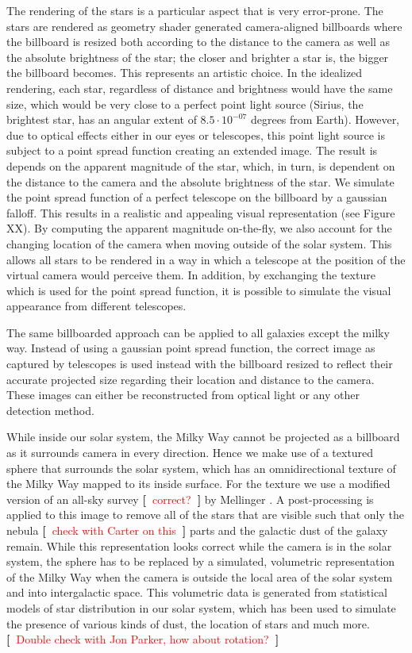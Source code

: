 \documentclass{vgtc}                %
\newcommand{\todo}[1]{\textbf{[~}\textcolor {red}{#1}\marginpar{\textcolor {red}{\centerline{{\Huge \textbf{!}}}}}\textbf{~]}}
\begin{document}
The rendering of the stars is a particular aspect that is very error-prone. The stars are rendered as geometry shader generated camera-aligned billboards where the billboard is resized both according to the distance to the camera as well as the absolute brightness of the star; the closer and brighter a star is, the bigger the billboard becomes. This represents an artistic choice. In the idealized rendering, each star, regardless of distance and brightness would have the same size, which would be very close to a perfect point light source (Sirius, the brightest star, has an angular extent of $8.5 \cdot 10^{-07}$ degrees from Earth). However, due to optical effects either in our eyes or telescopes, this point light source is subject to a point spread function creating an extended image. The result is depends on the apparent magnitude of the star, which, in turn, is dependent on the distance to the camera and the absolute brightness of the star. We simulate the point spread function of a perfect telescope on the billboard by a gaussian falloff. This results in a realistic and appealing visual representation (see Figure XX). By computing the apparent magnitude on-the-fly, we also account for the changing location of the camera when moving outside of the solar system. This allows all stars to be rendered in a way in which a telescope at the position of the virtual camera would perceive them. In addition, by exchanging the texture which is used for the point spread function, it is possible to simulate the visual appearance from different telescopes.

The same billboarded approach can be applied to all galaxies except the milky way. Instead of using a gaussian point spread function, the correct image as captured by telescopes is used instead with the billboard resized to reflect their accurate projected size regarding their location and distance to the camera. These images can either be reconstructed from optical light or any other detection method.

While inside our solar system, the Milky Way cannot be projected as a billboard as it surrounds camera in every direction. Hence we make use of a textured sphere that surrounds the solar system, which has an omnidirectional texture of the Milky Way mapped to its inside surface. For the texture we use a modified version of an all-sky survey \todo{correct?} by Mellinger \cite{Mellinger}. A post-processing is applied to this image to remove all of the stars that are visible such that only the nebula \todo{check with Carter on this} parts and the galactic dust of the galaxy remain. While this representation looks correct while the camera is in the solar system, the sphere has to be replaced by a simulated, volumetric representation of the Milky Way when the camera is outside the local area of the solar system and into intergalactic space. This volumetric data is generated from statistical models of star distribution in our solar system, which has been used to simulate the presence of various kinds of dust, the location of stars and much more. \todo{Double check with Jon Parker, how about rotation?} 
\end{document}
